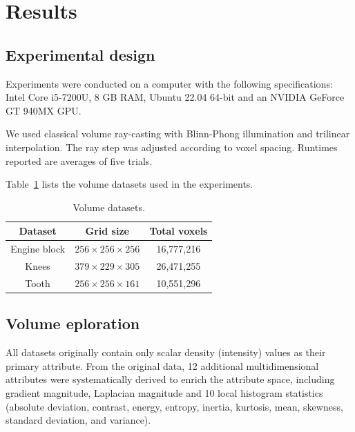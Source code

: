 \section{Results}
\label{sect:results}

\subsection{Experimental design}
\label{subsect:experimental-design}

Experiments were conducted on a computer with the following specifications: Intel Core i5-7200U, 8 GB RAM, Ubuntu 22.04 64-bit and an NVIDIA GeForce GT 940MX GPU.

We used classical volume ray-casting with Blinn-Phong illumination and trilinear interpolation. The ray step was adjusted according to voxel spacing. Runtimes reported are averages of five trials.

Table~\ref{tab:datasets-descriptions} lists the volume datasets used in the experiments.

\begin{table}[htb!]
    \centering
    \caption{Volume datasets.}
    \begin{tabular}{@{}ccc@{}}
        \toprule
        \textbf{Dataset} & \textbf{Grid size} & \textbf{Total voxels} \\ 
        \midrule
        Engine block & $256 \times 256 \times 256$ & 16,777,216\\
        Knees & $379 \times 229 \times 305$ & 26,471,255\\
        Tooth & $256 \times 256 \times 161$ & 10,551,296\\
        \bottomrule
    \end{tabular}
    \label{tab:datasets-descriptions}
\end{table}


\subsection{Volume eploration}
\label{subsect:volume-exploration}

All datasets originally contain only scalar density (intensity) values as their primary attribute. From the original data, 12 additional multidimensional attributes were systematically derived to enrich the attribute space, including gradient magnitude, Laplacian magnitude and 10 local histogram statistics (absolute deviation, contrast, energy, entropy, inertia, kurtosis, mean, skewness, standard deviation, and variance).

